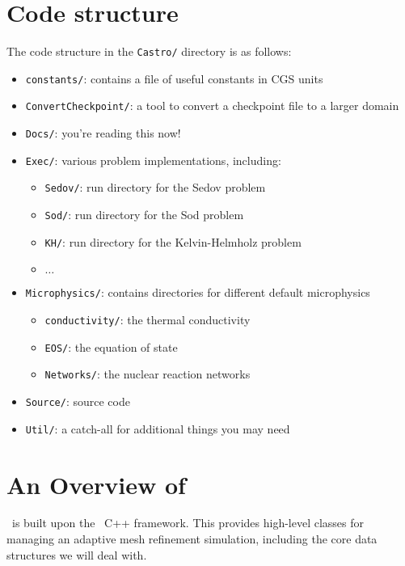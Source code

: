 \section{Code structure}

The code structure in the {\tt Castro/} directory is as follows:
\begin{itemize}
\item {\tt constants/}: contains a file of useful constants in CGS units

\item {\tt ConvertCheckpoint/}: a tool to convert a checkpoint file to
  a larger domain

\item {\tt Docs/}: you're reading this now!

\item {\tt Exec/}: various problem implementations, including:
  \begin{itemize}
  \item {\tt Sedov/}: run directory for the Sedov problem
  \item {\tt Sod/}: run directory for the Sod problem
  \item {\tt KH/}: run directory for the Kelvin-Helmholz problem
  \item $\ldots$
  \end{itemize}

\item {\tt Microphysics/}: contains directories for different default microphysics
  \begin{itemize}
  \item {\tt conductivity/}: the thermal conductivity
  \item {\tt EOS/}: the equation of state
  \item {\tt Networks/}: the nuclear reaction networks
  \end{itemize}

\item {\tt Source/}: source code

\item {\tt Util/}: a catch-all for additional things you may need 
\end{itemize}


\section{An Overview of \castro}

\castro\ is built upon the \boxlib\ C++ framework.  This provides
high-level classes for managing an adaptive mesh refinement simulation,
including the core data structures we will deal with.

